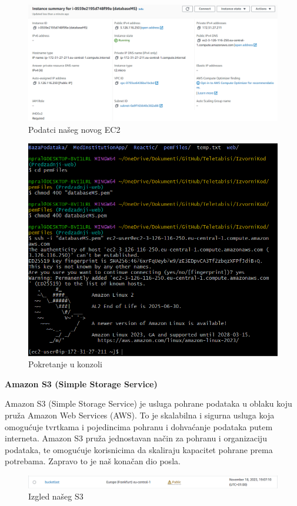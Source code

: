 				\begin{figure}[H]
				\includegraphics[scale=1]{slike/Deploy4.PNG} %
				\centering
				\caption{Podatci našeg novog EC2}
				\label{fig:promjene}
			\end{figure}
			
			\begin{figure}[H]
				\includegraphics[scale=1]{slike/Deploy5.PNG} %
				\centering
				\caption{Pokretanje u konzoli}
				\label{fig:promjene}
			\end{figure}
			
			\textbf{Amazon S3  (Simple Storage Service) }
			\newline
			
			
			Amazon S3 (Simple Storage Service) je usluga pohrane podataka u oblaku koju pruža Amazon Web Services (AWS). To je skalabilna i sigurna usluga koja omogućuje tvrtkama i pojedincima pohranu i dohvaćanje podataka putem interneta. Amazon S3 pruža jednostavan način za pohranu i organizaciju podataka, te omogućuje korisnicima da skaliraju kapacitet pohrane prema potrebama. Zapravo to je naš konačan dio posla.
			
				\begin{figure}[H]
				\includegraphics[scale=1]{slike/Deploy6.PNG} %
				\centering
				\caption{Izgled našeg S3}
				\label{fig:promjene}
			\end{figure}
			
			
			\eject 